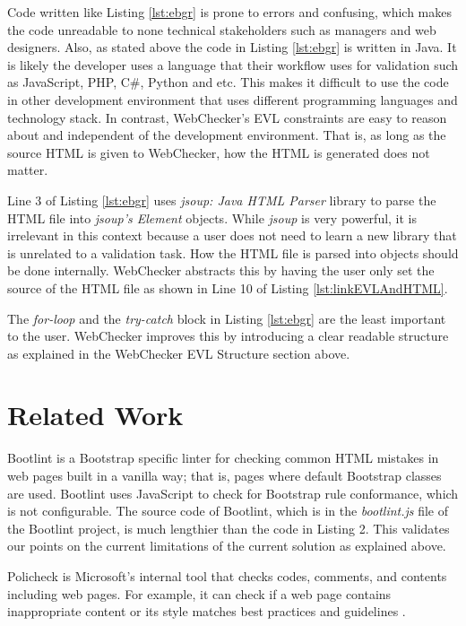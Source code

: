 \documentclass[conference]{IEEETran}
\begin{document}
Code written like Listing \ref{lst:ebgr} is prone to errors and confusing, which makes the code unreadable to none technical stakeholders such as managers and web designers. Also, as stated above the code in Listing  \ref{lst:ebgr}  is written in Java. It is likely the developer uses a language that their workflow uses for validation such as JavaScript, PHP, C\#, Python and etc. This makes it difficult to use the code in other development environment that uses different programming languages and technology stack. In contrast, WebChecker's EVL constraints are easy to reason about and independent of the development environment. That is, as long as the source HTML is given to WebChecker, how the HTML is generated does not matter. 

Line 3 of Listing \ref{lst:ebgr} uses \textit{jsoup: Java HTML Parser}\cite{jsoup} library to parse the HTML file into \textit{jsoup's Element} objects. While \textit{jsoup} is very powerful, it is irrelevant in this context because a user does not need to learn a new library that is unrelated to a validation task. How the HTML file is parsed into objects should be done internally. WebChecker abstracts this by having the user only set the source of the HTML file as shown in Line 10 of Listing \ref{lst:linkEVLAndHTML}.           


The \textit{for-loop} and the \textit{try-catch} block in Listing \ref{lst:ebgr} are the least important to the user. WebChecker improves this by introducing a clear readable structure as explained in the WebChecker EVL Structure section above.  


\section{Related Work}
Bootlint \cite{bootlint} is a Bootstrap specific linter for checking common HTML mistakes in web pages built in a vanilla way; that is, pages where default Bootstrap classes are used. Bootlint uses JavaScript to check for Bootstrap rule conformance, which is not configurable. The source code of Bootlint, which is in the \textit{bootlint.js} file of the Bootlint project, is much lengthier than the code in Listing 2. This validates our points on the current limitations of the current solution as explained above. 

Policheck is Microsoft's internal tool that checks codes, comments, and contents including web pages. For example, it can check if a web page contains inappropriate content or its style matches best practices and guidelines \cite{christakis16}.
\end{document}
